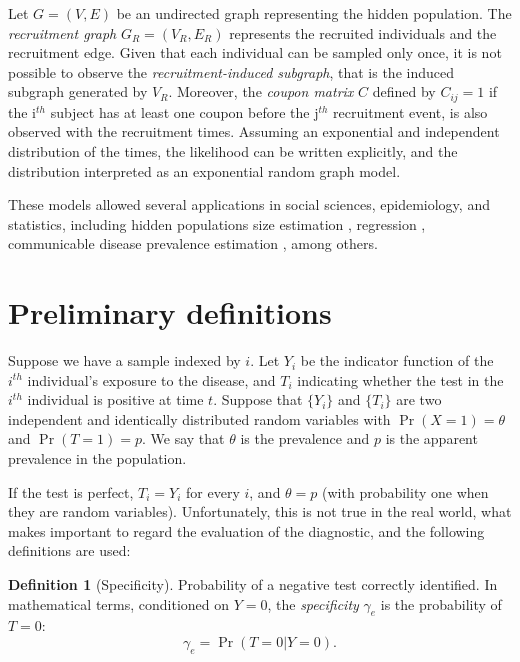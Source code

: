 \documentclass[a4paper, notitlepage, 11pt]{article}
\theoremstyle{definition}
\newtheorem{definition}{Definition}[section]
\theoremstyle{remark}
\begin{document}
Let $G = (V,E)$ be an undirected graph representing the hidden population. The {\em recruitment graph} $G_R =
(V_R, E_R)$ represents the recruited individuals and the recruitment edge.
Given that each individual can be sampled only once, it is not possible to
observe the {\em recruitment-induced subgraph}, that is the induced subgraph
generated by $V_R$. Moreover, the {\em coupon matrix} $C$ defined by $C_{ij} =
1$ if the i$^{th}$ subject has at least one coupon before the j$^{th}$
recruitment event, is also observed with the recruitment times. Assuming an
exponential and independent distribution of the times, the likelihood can be
written explicitly, and the distribution interpreted as an exponential random graph
model. 

These models allowed several applications in social sciences, epidemiology,
and statistics, including hidden populations size estimation
\cite{crawford2018hidden}, regression \cite{bastos2012binary}, communicable
disease prevalence estimation \cite{albuquerque2009avaliaccao}, among others.

\section{Preliminary definitions}

Suppose we have a sample indexed by $i$. Let $Y_i$ be the indicator
function of the $i^{th}$ individual's exposure to the disease, and $T_i$
indicating whether the test in the $i^{th}$ individual is positive at time
$t$. Suppose that $\{Y_i\}$ and $\{T_i\}$ are two independent and identically distributed
random variables with $\Pr(X = 1) = \theta$ and $\Pr(T = 1) = p$. We say that
$\theta$ is the prevalence and $p$ is the apparent prevalence in the
population. 

If the test is perfect, $T_i = Y_i$ for every $i$, and
$\theta = p$ (with probability one when they are random variables).
Unfortunately, this is not true in the real world, what makes important to
regard the evaluation of the diagnostic, and the following definitions are used:

\begin{definition}[Specificity]
  Probability of a negative test correctly identified. In mathematical terms,
  conditioned on $Y = 0$, the {\em specificity} $\gamma_e$ is the probability of $T = 0$: 
  \begin{equation}
    \gamma_e = \Pr(T = 0|Y = 0). 
  \end{equation} 
\end{definition}
\end{document}

